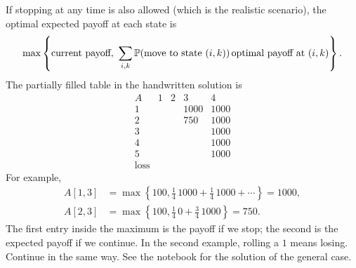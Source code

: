 \documentclass[a4paper]{article}
\begin{document}
\medskip
If stopping at any time is also allowed (which is the realistic scenario),
the optimal expected payoff at each state is
\[
\max\left\{\text{current payoff},\
\sum_{i,k}\P(\text{move to state }(i,k))\,
\text{optimal payoff at }(i,k)\right\}.
\]
The partially filled table in the handwritten solution is
\[
\begin{array}{c|rrrr}
A&1&2&3&4\\ \hline
1&&&1000&1000\\
2&&&750&1000\\
3&&&&1000\\
4&&&&1000\\
5&&&&1000\\
\text{loss}&&&&
\end{array}
\]
For example,
\begin{align*}
A[1,3]
&=\max\left\{100,\frac14\,1000+\frac14\,1000+\cdots\right\}
=1000,\\
A[2,3]
&=\max\left\{100,\frac14\,0+\frac34\,1000\right\}=750.
\end{align*}
The first entry inside the maximum is the payoff if we stop; the second
is the expected payoff if we continue. In the second example, rolling a
$1$ means losing. Continue in the same way. See the notebook for the
solution of the general case.
\end{document}
